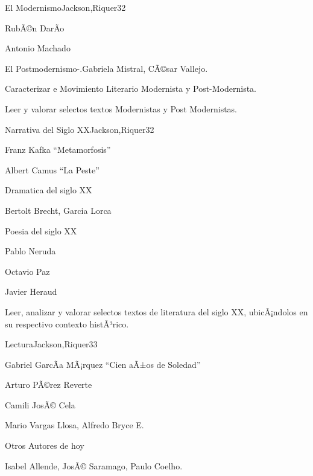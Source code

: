 \begin{syllabus}
\begin{unit}{El Modernismo}{Jackson,Riquer}{3}{2}
\begin{topics}
	\item RubÃ©n DarÃ­o
	\item Antonio Machado
	\item El Postmodernismo-.Gabriela Mistral, CÃ©sar Vallejo.
\end{topics}
\begin{unitgoals}
	\item Caracterizar e Movimiento Literario Modernista y Post-Modernista.
	\item Leer y valorar selectos textos Modernistas y Post Modernistas.
\end{unitgoals}
\end{unit}

\begin{unit}{Narrativa del Siglo XX}{Jackson,Riquer}{3}{2}
\begin{topics}
	\item Franz Kafka ``Metamorfosis''
	\item Albert Camus ``La Peste''
	\item Dramatica del siglo XX
	\item Bertolt Brecht, Garcia Lorca
	\item Poesia del siglo XX
	\item Pablo Neruda
	\item Octavio Paz
	\item Javier Heraud
\end{topics}
\begin{unitgoals}
	\item Leer, analizar y valorar selectos textos de literatura del siglo XX, ubicÃ¡ndolos en su respectivo contexto histÃ³rico.
\end{unitgoals}
\end{unit}

\begin{unit}{Lectura}{Jackson,Riquer}{3}{3}
\begin{topics}
	\item Gabriel GarcÃ­a MÃ¡rquez ``Cien aÃ±os de Soledad''
	\item Arturo PÃ©rez Reverte
	\item Camili JosÃ© Cela
	\item Mario Vargas Llosa, Alfredo Bryce E.
	\item Otros Autores de hoy
	\item Isabel Allende, JosÃ© Saramago, Paulo Coelho.
\end{topics}
\end{unit}



\begin{coursebibliography}
\end{coursebibliography}
\end{syllabus}
